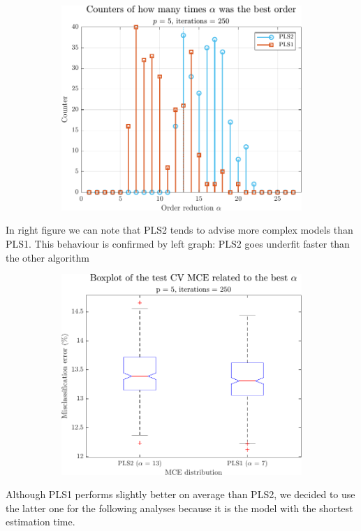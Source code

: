 \begin{frame}
\begin{figure}
\begin{subfigure}[b]{0.49\textwidth}
			\includegraphics[width=\textwidth]{Images/counters_alpha_5.pdf}
		\end{subfigure}
	\end{figure}
	In right figure we can note that PLS2 tends to advise more complex models than PLS1. This behaviour is confirmed by left graph: PLS2 goes underfit faster than the other algorithm
\end{frame}

\begin{frame}
	\begin{figure}
		\centering
		\begin{subfigure}[b]{0.60\textwidth}
			\includegraphics[width=\textwidth]{Images/box_alpha_5.pdf}
		\end{subfigure}
	\end{figure}
	Although PLS1 performs slightly better on average than PLS2, we decided to use the latter one for the following analyses because it is the model with the shortest estimation time.
\end{frame}

